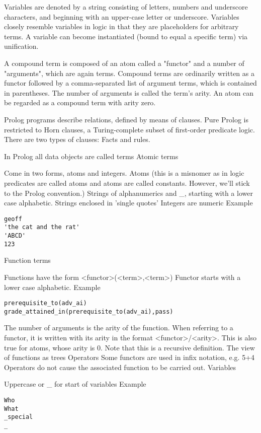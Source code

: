 \documentclass[thesis-solanki.tex]{subfiles}
\begin{document}
\begin{enumerate}
\begin{enumerate}
Variables are denoted by a string consisting of letters, numbers and underscore characters, and beginning with an upper-case letter or 
underscore. Variables closely resemble variables in logic in that they are placeholders for arbitrary terms. A variable can become 
instantiated (bound to equal a specific term) via unification.

A compound term is composed of an atom called a "functor" and a number of "arguments", which are again terms. Compound terms are ordinarily 
written as a functor followed by a comma-separated list of argument terms, which is contained in parentheses. The number of arguments is 
called the term's arity. An atom can be regarded as a compound term with arity zero.

Prolog programs describe relations, defined by means of clauses. Pure Prolog is restricted to Horn clauses, a Turing-complete subset of 
first-order predicate logic. There are two types of clauses: Facts and rules.



\cite{website:prologintroumiami}
In Prolog all data objects are called terms
Atomic terms

Come in two forms, atoms and integers.
Atoms (this is a misnomer as in logic predicates are called atoms and atoms are called constants. However, we'll stick to the Prolog convention.)
Strings of alphanumerics and \_, starting with a lower case alphabetic.
Strings enclosed in 'single quotes'
Integers are numeric
Example
\begin{verbatim}
geoff
'the cat and the rat'
'ABCD'
123
\end{verbatim}
     
Function terms

Functions have the form <functor>(<term>{,<term>})
Functor starts with a lower case alphabetic.
Example
\begin{verbatim}
prerequisite_to(adv_ai)
grade_attained_in(prerequisite_to(adv_ai),pass)
\end{verbatim}
     
The number of arguments is the arity of the function. When referring to a functor, it is written with its arity in the format <functor>/<arity>. This is also true for atoms, whose arity is 0.
Note that this is a recursive definition.
The view of functions as trees
Operators
Some functors are used in infix notation, e.g. 5+4
Operators do not cause the associated function to be carried out.
Variables

Uppercase or \_ for start of variables
Example
\begin{verbatim}
Who
What
_special
_
\end{verbatim}
     

\end{enumerate}
\end{enumerate}
\end{document}
